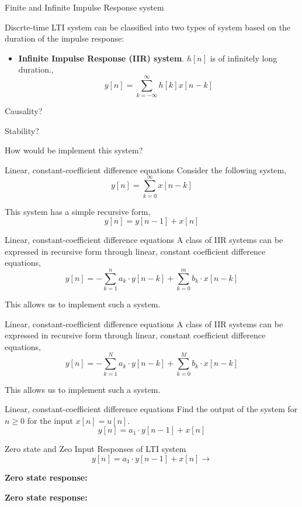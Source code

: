 \documentclass[aspectratio=169]{beamer}
\let\olditem\item
\renewcommand{\item}{\setlength{\itemsep}{\fill}\olditem}
\begin{document}
\begin{frame}[t]{Finite and Infinite Impulse Response system}

Discrte-time LTI system can be classified into two types of system based on the duration of the impulse response:
\begin{itemize}
  \item \textbf{Infinite Impulse Response (IIR) system}. $h[n]$ is of infinitely long  duration.,
  \[  y[n] = \sum_{k=-\infty}^{\infty} h[k]x[n-k] \]
\end{itemize}

Causality? \vspace{0.5cm}

Stability?

How would be implement this system?

\end{frame}

\begin{frame}[t]{Linear, constant-coefficient difference equations}
Consider the following system,
\[ y[n] = \sum_{k=0}^{\infty} x[n-k] \]

This system has a simple recursive form,
\[ y[n] = y[n-1] + x[n] \]
\end{frame}

\begin{frame}[t]{Linear, constant-coefficient difference equations}
A class of IIR systems can be expressed in recursive form through linear, constant coefficient difference equations,
\[ y[n] = -\sum_{k=1}^n a_k \cdot y[n - k] + \sum_{k=0}^{m} b_k \cdot x[n-k] \]

This allows us to implement such a system.
\end{frame}

\begin{frame}[t]{Linear, constant-coefficient difference equations}
A class of IIR systems can be expressed in recursive form through linear, constant coefficient difference equations,
\[ y[n] = -\sum_{k=1}^N a_k \cdot y[n - k] + \sum_{k=0}^{M} b_k \cdot x[n-k] \]

This allows us to implement such a system.
\end{frame}

\begin{frame}[t]{Linear, constant-coefficient difference equations}
Find the output of the system for $n \geq 0$ for the input $x[n] = u[n]$.
\[ y[n] = a_1 \cdot y[n - 1] + x[n] \]
\end{frame}

\begin{frame}[t]{Zero state and Zeo Input Responses of LTI system}
\[ y[n] = a_1 \cdot y[n - 1] + x[n] \longrightarrow \]

\textbf{Zero state response:} \vspace{2cm}


\textbf{Zero state response:} \vspace{2cm}
\end{frame}
\end{document}
